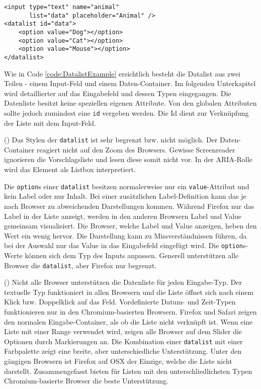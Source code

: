 \begin{lstlisting}[style = htmlcssjs, caption = Datalist Example, label = code:DatalistExample]
<input type="text" name="animal" 
       list="data" placeholder="Animal" />
<datalist id="data">
    <option value="Dog"></option>
    <option value="Cat"></option>
    <option value="Mouse"></option>
</datalist>
\end{lstlisting}

Wie in Code \ref{code:DatalistExample} ersichtlich besteht die Datalist aus zwei Teilen - einem Input-Feld und einem Daten-Container. 
Im folgenden Unterkapitel \textbf{} wird detaillierter auf das Eingabefeld und dessen Typen eingegangen.
Die Datenliste besitzt keine speziellen eigenen Attribute.
Von den globalen Attributen sollte jedoch zumindest eine \texttt{id} vergeben werden.
Die Id dient zur Verknüpfung der Liste mit dem Input-Feld. 

(\cite{datalistMdn}) Das Stylen der \texttt{datalist} ist sehr begrenzt bzw. nicht möglich. 
Der Daten-Container reagiert nicht auf den Zoom des Browsers.
Gewisse Screenreader ignorieren die Vorschlagsliste und lesen diese somit nicht vor.
In der ARIA-Rolle wird das Element als Listbox interpretiert.

Die \texttt{option}s einer \texttt{datalist} besitzen normalerweise nur ein \texttt{value}-Attribut und kein Label oder nur Inhalt.
Bei einer zusätzlichen Label-Definition kann das je nach Browser zu abweichenden Darstellungen kommen. 
Während Firefox nur das Label in der Liste anzeigt, werden in den anderen Browsern Label und Value gemeinsam visualisiert. 
Die Browser, welche Label und Value anzeigen, heben den Wert ein wenig hervor.
Die Darstellung kann zu Missverständnissen führen, da bei der Auswahl nur das Value in das Eingabefeld eingefügt wird. 
Die \texttt{option}s-Werte können sich dem Typ des Inputs anpassen. 
Generell unterstützen alle Browser die \texttt{datalist}, aber Firefox nur begrenzt.

(\cite{datalistMdn}) Nicht alle Browser unterstützen die Datenliste für jeden Eingabe-Typ.
Der textuelle Typ funktioniert in allen Browsern und die Liste öffnet sich nach einem Klick bzw. Doppelklick auf das Feld.
Vordefinierte Datum- und Zeit-Typen funktionieren nur in den Chromium-basierten Browsern. 
Firefox und Safari zeigen den normalen Eingabe-Container, als ob die Liste nicht verknüpft ist.
Wenn eine Liste mit einer Range verwendet wird, zeigen alle Browser auf dem Slider die Optionen durch Markierungen an.
Die Kombination einer \texttt{datalist} mit einer Farbpalette zeigt eine breite, aber unterschiedliche Unterstützung. 
Unter den gängigen Browsern ist Firefox auf OSX der Einzige, welche die Liste nicht darstellt.
Zusammengefasst bieten für Listen mit den unterschliedlichsten Typen Chromium-basierte Browser die beste Unterstützung.


